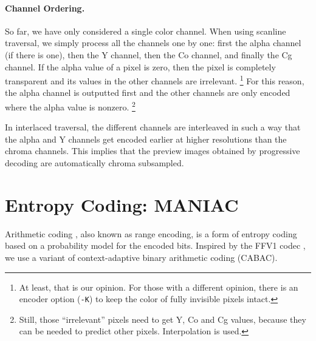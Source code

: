 \documentclass{article}
\begin{document}
\paragraph{Channel Ordering.}
So far, we have only considered a single color channel. %
When using scanline traversal, we simply process all the channels one by one:
first the alpha channel (if there is one),
then the Y channel, then the Co channel, and finally the Cg channel.
If the alpha value of a pixel is zero, then the pixel is completely transparent
and its values in the other channels are irrelevant.%
\footnote{At least, that is our opinion.
For those with a different opinion,
there is an encoder option ({\tt -K}) to keep the color of fully invisible pixels intact.}
For this reason, the alpha channel is outputted first and the other channels are only encoded where the alpha value is nonzero.%
\footnote{
Still, those ``irrelevant'' pixels need to get Y, Co and Cg values, because they can be needed to predict other pixels.
Interpolation is used.
}

In interlaced traversal, the different channels are interleaved in such a way that the alpha and Y channels
get encoded earlier at higher resolutions than the chroma channels. This implies that the preview images obtained by progressive decoding
are automatically chroma subsampled.


\section{Entropy Coding: MANIAC}
\label{sec:rac}

Arithmetic coding \cite{ArithmeticCoding}, also known as range encoding,
is a form of entropy coding based on a probability model for the encoded bits.
Inspired by the FFV1 codec \cite{FFV1},
we use a variant of context-adaptive binary arithmetic coding (CABAC).
\end{document}
